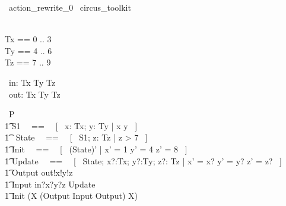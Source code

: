% 
\begin{zsection}
  \SECTION\ action\_rewrite\_0 \parents\ circus\_toolkit
\end{zsection}

\begin{zed}
    [T] \\
	Tx == 0 .. 3 \\ 
	Ty == 4 .. 6 \\ 
	Tz == 7 .. 9 \\ 
\end{zed}

\begin{circus}
	\circchannel\ in: Tx \cross Ty \cross Tz \\
	\circchannel\ out: Tx \cross Ty \cross Tz \\
\end{circus}

\begin{circus}
    \circprocess\ P \circdef \circbegin \\
        \t1 S1 ~~==~~ [~  x: Tx; y: Ty | x  \land y  ~] \\
        \t1 \circstate\ State ~~==~~ [~ S1; z: Tz | z > 7 ~] \\
        \t1 Init ~~==~~ [~ (State)' | x' = 1 \land y' = 4 \land z' = 8 ~] \\
        \t1 Update ~~==~~ [~ \Delta State; x?:Tx; y?:Ty; z?: Tz | x' = x? \land y' = y? \land z' = z? ~] \\
        \t1 Output \circdef out!x!y!z \then \Skip \\
        \t1 Input \circdef in?x?y?z \then \lschexpract Update \rschexpract \\
        \t1 \circspot \lschexpract Init \rschexpract \circseq (\circmu X \circspot (Output \extchoice Input \extchoice Output) \circseq X) \\ 
	\circend
\end{circus}

